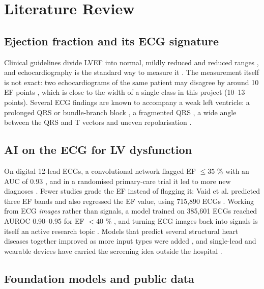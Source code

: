 \chapter{Literature Review}\label{ch:2}

\section{Ejection fraction and its ECG signature}\label{sec:2.1}

Clinical guidelines divide LVEF into normal, mildly reduced and reduced ranges \cite{ref1,ref2}, and echocardiography is the standard way to measure it \cite{ref5}. The measurement itself is not exact: two echocardiograms of the same patient may disagree by around 10 EF points \cite{ref6}, which is close to the width of a single class in this project (10--13 points). Several ECG findings are known to accompany a weak left ventricle: a prolonged QRS or bundle-branch block \cite{ref7}, a fragmented QRS \cite{ref8}, a wide angle between the QRS and T vectors \cite{ref9} and uneven repolarisation \cite{ref10,ref11}.

\section{AI on the ECG for LV dysfunction}\label{sec:2.2}

On digital 12-lead ECGs, a convolutional network flagged EF $\le35$ \% with an AUC of 0.93 \cite{ref3}, and in a randomised primary-care trial it led to more new diagnoses \cite{ref4}. Fewer studies grade the EF instead of flagging it: Vaid et al. predicted three EF bands and also regressed the EF value, using 715,890 ECGs \cite{ref12}. Working from ECG \emph{images} rather than signals, a model trained on 385,601 ECGs reached AUROC 0.90--0.95 for EF $<40$ \% \cite{ref13}, and turning ECG images back into signals is itself an active research topic \cite{ref14,ref15,ref16}. Models that predict several structural heart diseases together improved as more input types were added \cite{ref17}, and single-lead and wearable devices have carried the screening idea outside the hospital \cite{ref18,ref19,ref20}.

\section{Foundation models and public data}\label{sec:2.3}



